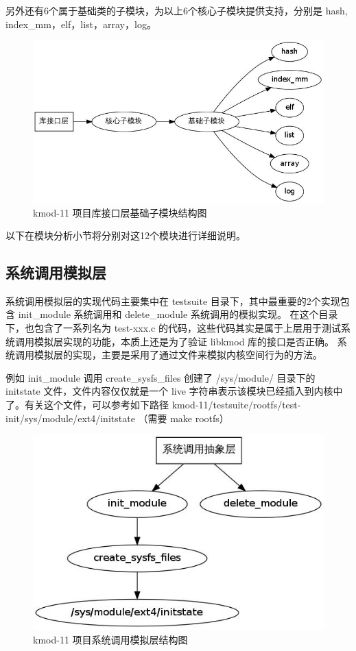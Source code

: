 另外还有6个属于基础类的子模块，为以上6个核心子模块提供支持，分别是 hash,
index\_mm，elf，list，array，log。

\begin{figure}[htbp]
\centering
\includegraphics{./figures/2-base.jpg}
\caption{kmod-11 项目库接口层基础子模块结构图}
\end{figure}

以下在模块分析小节将分别对这12个模块进行详细说明。

\subsection{系统调用模拟层}

系统调用模拟层的实现代码主要集中在 testsuite
目录下，其中最重要的2个实现包含 init\_module 系统调用和 delete\_module
系统调用的模拟实现。 在这个目录下，也包含了一系列名为 test-xxx.c
的代码，这些代码其实是属于上层用于测试系统调用模拟层实现的功能，本质上还是为了验证
libkmod 库的接口是否正确。
系统调用模拟层的实现，主要是采用了通过文件来模拟内核空间行为的方法。

例如 init\_module 调用 create\_sysfs\_files 创建了 /sys/module/ 目录下的
initstate 文件，文件内容仅仅就是一个 live
字符串表示该模块已经插入到内核中了。有关这个文件，可以参考如下路径
kmod-11/testsuite/rootfs/test-init/sys/module/ext4/initstate （需要 make
rootfs）

\begin{figure}[htbp]
\centering
\includegraphics{./figures/3-syscall.jpg}
\caption{kmod-11 项目系统调用模拟层结构图}
\end{figure}

